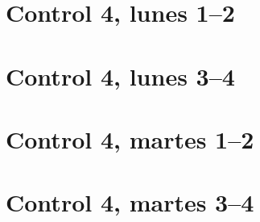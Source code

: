 \documentclass[12pt,spanish,a5paper,landscape]{article}
\begin{document}
  \pagestyle{empty}
  \thispagestyle{empty}

  \part*{Control 4, lunes 1--2}
  \newpage

  \newpage

  \part*{Control 4, lunes 3--4}
  \newpage

  \newpage

  \part*{Control 4, martes 1--2}
  \newpage

  \newpage

  \part*{Control 4, martes 3--4}
  \newpage
\end{document}
